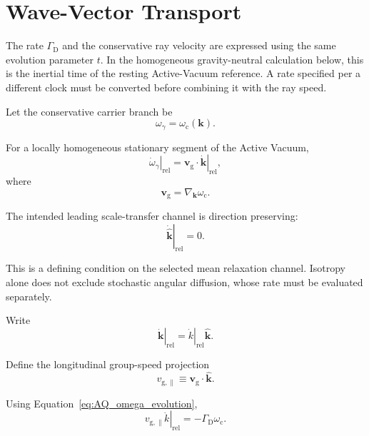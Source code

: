 \section{Wave-Vector Transport}

The rate $\Gamma_{\mathrm D}$ and the conservative ray velocity are expressed
using the same evolution parameter $t$. In the homogeneous gravity-neutral
calculation below, this is the inertial time of the resting Active-Vacuum
reference. A rate specified per a different clock must be converted before
combining it with the ray speed.

Let the conservative carrier branch be
\begin{equation}
    \omega_{\gamma}
    =
    \omega_{\mathrm c}(\mathbf{k}).
\end{equation}

For a locally homogeneous stationary segment of the Active Vacuum,
\begin{equation}
    \left.\dot\omega_{\gamma}\right|_{\mathrm{rel}}
    =
    \mathbf{v}_{\mathrm g}
    \cdot
    \left.\dot{\mathbf{k}}\right|_{\mathrm{rel}},
\end{equation}
where
\begin{equation}
    \mathbf{v}_{\mathrm g}
    =
    \nabla_{\mathbf{k}}
    \omega_{\mathrm c}.
\end{equation}

The intended leading scale-transfer channel is direction preserving:
\begin{equation}
    \boxed{
    \left.
    \dot{\hat{\mathbf{k}}}
    \right|_{\mathrm{rel}}
    =
    0.
    }
    \label{eq:AQ_direction_preservation}
\end{equation}

This is a defining condition on the selected mean relaxation channel. Isotropy
alone does not exclude stochastic angular diffusion, whose rate must be
evaluated separately.

Write
\begin{equation}
    \left.\dot{\mathbf{k}}\right|_{\mathrm{rel}}
    =
    \left.\dot k\right|_{\mathrm{rel}}
    \hat{\mathbf{k}}.
\end{equation}

Define the longitudinal group-speed projection
\begin{equation}
    v_{\mathrm{g},\parallel}
    \equiv
    \mathbf{v}_{\mathrm g}
    \cdot
    \hat{\mathbf{k}}.
\end{equation}

Using Equation~\eqref{eq:AQ_omega_evolution},
\begin{equation}
    v_{\mathrm{g},\parallel}
    \left.\dot k\right|_{\mathrm{rel}}
    =
    -\Gamma_{\mathrm D}
    \omega_{\mathrm c}.
\end{equation}

